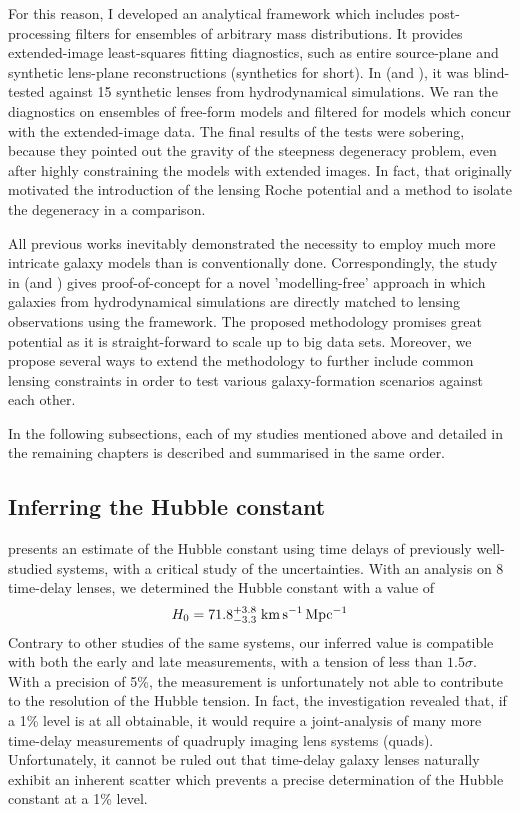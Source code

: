 For this reason, I developed an analytical framework  \cite{gleam}
which includes post-processing filters for ensembles of arbitrary mass
distributions.  It provides extended-image least-squares fitting diagnostics,
such as entire source-plane and synthetic lens-plane reconstructions (synthetics
for short).  In  (and ), it was blind-tested
against 15 synthetic lenses from hydrodynamical simulations.  We ran the
diagnostics on ensembles of free-form models and filtered for models which
concur with the extended-image data.  The final results of the tests were
sobering, because they pointed out the gravity of the steepness degeneracy
problem, even after highly constraining the models with extended images.  In
fact, that originally motivated the introduction of the lensing Roche potential
and a method to isolate the degeneracy in a comparison.

All previous works inevitably demonstrated the necessity to employ much more
intricate galaxy models than is conventionally done.  Correspondingly, the study
in  (and ) gives proof-of-concept for a novel
'modelling-free' approach in which galaxies from hydrodynamical simulations are
directly matched to lensing observations using the  framework.  The
proposed methodology promises great potential as it is straight-forward to scale
up to big data sets.  Moreover, we propose several ways to extend the
methodology to further include common lensing constraints in order to test
various galaxy-formation scenarios against each other.

In the following subsections, each of my studies mentioned above and detailed in
the remaining chapters is described and summarised in the same order.

\subsection{Inferring the Hubble constant}

 presents an estimate of the Hubble constant
using time delays of previously well-studied systems, with a critical study of the uncertainties.  With an analysis on 8
time-delay lenses, we determined the Hubble constant with a value of
%
\begin{equation*}%
    \Ho = 71.8^{+3.8}_{-3.3}\;\Hunitsalt
\end{equation*}%
%
Contrary to other studies of the same systems, our inferred value is compatible
with both the early and late measurements, with a tension of less than
$1.5\sigma$.  With a precision of 5\%, the measurement is unfortunately not
able to contribute to the resolution of the Hubble tension.  In fact, the
investigation revealed that, if a 1\% level is at all obtainable, it would
require a joint-analysis of many more time-delay measurements of quadruply
imaging lens systems (quads).  Unfortunately, it cannot be ruled out that
time-delay galaxy lenses naturally exhibit an inherent scatter which prevents a
precise determination of the Hubble constant at a 1\% level.  

